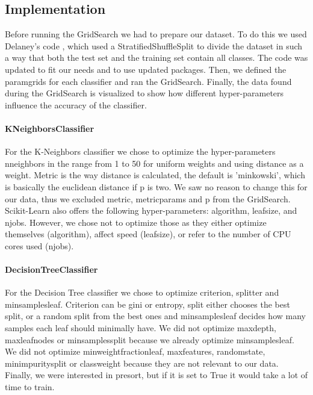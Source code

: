 \documentclass{article}
\begin{document}
	\subsection{Implementation}
		Before running the GridSearch we had to prepare our dataset. To do this we used Delaney's code \cite{showdown}, which used a StratifiedShuffleSplit to divide the dataset in such a way that both the test set and the training set contain all classes.  The code was updated to fit our needs and to use updated packages. Then, we defined the param\textunderscore grids for each classifier and ran the GridSearch. Finally, the data found during the GridSearch is visualized to show how different hyper-parameters influence the accuracy of the classifier.
		\paragraph{KNeighborsClassifier}
			For the K-Neighbors classifier we chose to optimize the hyper-parameters n\textunderscore neighbors in the range from 1 to 50 for uniform weights and using distance as a weight. Metric is the way distance is calculated, the default is 'minkowski', which is basically the euclidean distance if p is two. We saw no reason to change this for our data, thus we excluded metric, metric\textunderscore params and p from the GridSearch. Scikit-Learn also offers the following hyper-parameters: algorithm, leaf\textunderscore size, and n\textunderscore jobs. However, we chose not to optimize those as they either optimize themselves (algorithm), affect speed (leaf\textunderscore size), or refer to the number of CPU cores used (n\textunderscore jobs). 
			
		\paragraph{DecisionTreeClassifier}
			For the Decision Tree classifier we chose to optimize criterion, splitter and min\textunderscore samples\textunderscore leaf. Criterion can be gini or entropy, split either chooses the best split, or a random split from the best ones and min\textunderscore samples\textunderscore leaf decides how many samples each leaf should minimally have. We did not optimize max\textunderscore depth, max\textunderscore leaf\textunderscore nodes or min\textunderscore samples\textunderscore split because we already optimize min\textunderscore samples\textunderscore leaf. We did not  optimize min\textunderscore weight\textunderscore fraction\textunderscore leaf, max\textunderscore features, random\textunderscore state, min\textunderscore impurity\textunderscore split or class\textunderscore weight because they are not relevant to our data. Finally, we were interested in presort, but if it is set to True it would take a lot of time to train.
\end{document}
